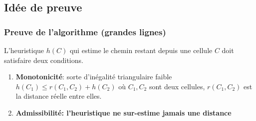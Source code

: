 \documentclass{beamer}
\begin{document}
\subsection{Idée de preuve}
\begin{frame}
  \frametitle{Preuve de l'algorithme (grandes lignes)}
  L'heuristique $h(C)$ qui estime le chemin restant depuis une cellule $C$
  doit satisfaire deux conditions.
  \begin{enumerate}
  \item<2-> \textbf{Monotonicité}: sorte d'inégalité triangulaire faible
    $h(C_1) \leq r(C_1,C_2) + h(C_2)$ où $C_1, C_2$ sont deux cellules,
    $r(C_1, C_2)$ est la distance réelle entre elles.
    \par\smallskip
  \item<3-> \textbf{Admissibilité: l'heuristique ne sur-estime jamais une distance}
    \par\smallskip
    \par\smallskip
  \end{enumerate}
\end{frame}
\end{document}
